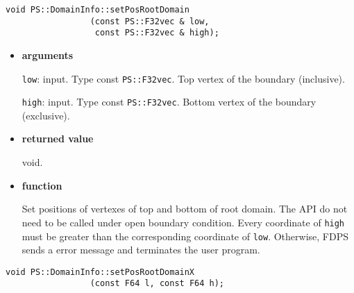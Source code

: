 
\begin{screen}
\begin{verbatim}
void PS::DomainInfo::setPosRootDomain
                 (const PS::F32vec & low,
                  const PS::F32vec & high);
\end{verbatim}
\end{screen}

\begin{itemize}

\item {\bf arguments}

\texttt{low}: input. Type const {\tt PS::F32vec}. Top vertex of the boundary (inclusive).

\texttt{high}: input. Type const {\tt PS::F32vec}. Bottom vertex of the boundary (exclusive).



\item {\bf returned value}

void.

\item {\bf function}

Set positions of vertexes of top and bottom of root domain. The API do
not need to be called under open boundary condition. Every coordinate
of \texttt{high} must be greater than the corresponding coordinate
of \texttt{low}. Otherwise, FDPS sends a error message and terminates
the user program.


\end{itemize}


\begin{screen}
\begin{verbatim}
void PS::DomainInfo::setPosRootDomainX
                 (const F64 l, const F64 h);
\end{verbatim}
\end{screen}

